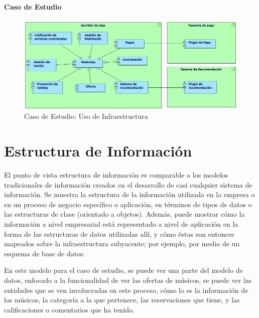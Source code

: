 \paragraph{Caso de Estudio}

\begin{figure}[h!]
	\centering
	\includegraphics[width=\linewidth]{Desarrollo/ArquitecturaEmpresarial/Tecnologia/imgs/uso2.png}
	\caption{Caso de Estudio: Uso de Infraestructura}
\end{figure}

\newpage

\section{Estructura de Información}
El punto de vista estructura de información es comparable a los modelos tradicionales de información creados en el desarrollo de casi cualquier sistema de información. Se muestra la estructura de la información utilizada en la empresa o en un proceso de negocio específico o aplicación, en términos de tipos de datos o las estructuras de clase (orientado a objetos). Además, puede mostrar cómo la información a nivel empresarial está representado a nivel de aplicación en la forma de las estructuras de datos utilizadas allí, y cómo éstas son entonces mapeados sobre la infraestructura subyacente; por ejemplo, por medio de un esquema de base de datos.  \vspace{\baselineskip}

En este modelo para el caso de estudio, se puede ver una parte del modelo de datos, enfocado a la funcionalidad de ver las ofertas de músicos, se puede ver las entidades que se ven involucradas en este proceso, cómo lo es la información de los músicos, la categoría a la que pertenece, las reservaciones que tiene, y las calificaciones o comentarios que ha tenido.

